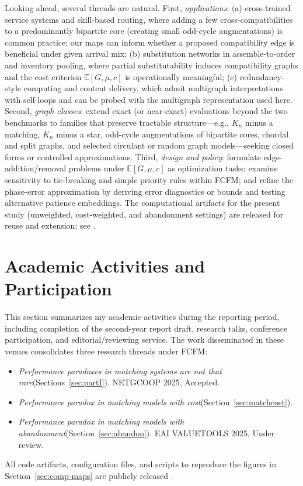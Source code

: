 \documentclass[11pt]{article}
\begin{document}
{Looking ahead, several threads are natural. First, \emph{applications}: (a) cross-trained service systems and skill-based routing, where adding a few cross-compatibilities to a predominantly bipartite core (creating small odd-cycle augmentations) is common practice; our maps can inform whether a proposed compatibility edge is beneficial under given arrival mix; (b) substitution networks in assemble-to-order and inventory pooling, where partial substitutability induces compatibility graphs and the cost criterion $\mathbb{E}[G,\mu,c]$ is operationally meaningful; (c) redundancy-style computing and content delivery, which admit multigraph interpretations with self-loops and can be probed with the multigraph representation used here. Second, \emph{graph classes}: extend exact (or near-exact) evaluations beyond the two benchmarks to families that preserve tractable structure—e.g., $K_n$ minus a matching, $K_n$ minus a star, odd-cycle augmentations of bipartite cores, chordal and split graphs, and selected circulant or random graph models—seeking closed forms or controlled approximations. Third, \emph{design and policy}: formulate edge-addition/removal problems under $\mathbb{E}[G,\mu,c]$ as optimization tasks; examine sensitivity to tie-breaking and simple priority rules within \textsc{FCFM}; and refine the phase-error approximation by deriving error diagnostics or bounds and testing alternative patience embeddings. The computational artifacts for the present study (unweighted, cost-weighted, and abandonment settings) are released for reuse and extension; see \cite{li2025,li2025a,li2025b}.

\section{Academic Activities and Participation}\label{sec:activities}

This section summarizes my academic activities during the reporting period, including completion of the second-year report draft, research talks, conference participation, and editorial/reviewing service. The work disseminated in these venues consolidates three research threads under \textsc{FCFM}:

\begin{itemize}\itemsep0.25em
\item \emph{Performance paradoxes in matching systems are not that rare}(Sections~\ref{sec:partI}). NETGCOOP 2025, Accepted.
\item \emph{Performance paradox in matching models with cost}(Section~\ref{sec:matchcost}).
\item \emph{Performance paradox in matching models with abandonment}(Section~\ref{sec:abandon}). EAI VALUETOOLS 2025, Under review.
\end{itemize}
All code artifacts, configuration files, and scripts to reproduce the figures in Section~\ref{sec:comp-maps} are publicly released \cite{li2025,li2025a,li2025b}.

}
\end{document}
